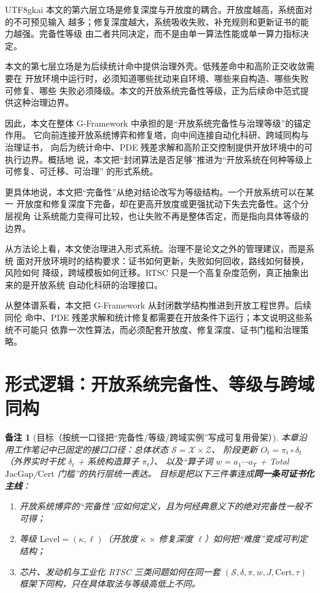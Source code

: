 \documentclass[12pt]{article}
\newtheorem{remark}{备注}[section]
\newcommand{\JacGap}{\ensuremath{\mathrm{JacGap}}}
\newcommand{\Cert}{\ensuremath{\mathrm{Cert}}}
\begin{document}
\begin{CJK*}{UTF8}{gkai}
本文的第六层立场是修复深度与开放度的耦合。开放度越高，系统面对的不可预见输入
越多；修复深度越大，系统吸收失败、补充规则和更新证书的能力越强。完备性等级
由二者共同决定，而不是由单一算法性能或单一算力指标决定。

本文的第七层立场是为后续统计命中提供治理外壳。低残差命中和高阶正交收敛需要在
开放环境中运行时，必须知道哪些扰动来自环境、哪些来自构造、哪些失败可修复、哪些
失败必须降级。本文的开放系统完备性等级，正为后续命中范式提供这种治理边界。

因此，本文在整体 G-Framework 中承担的是“开放系统完备性与治理等级”的锚定作用。
它向前连接开放系统博弈和修复塔，向中间连接自动化科研、跨域同构与治理证书，
向后为统计命中、PDE 残差求解和高阶正交控制提供开放环境中的可执行边界。概括地
说，本文把“封闭算法是否足够”推进为“开放系统在何种等级上可修复、可迁移、可治理”
的形式系统。

更具体地说，本文把“完备性”从绝对结论改写为等级结构。一个开放系统可以在某一
开放度和修复深度下完备，却在更高开放度或更强扰动下失去完备性。这个分层视角
让系统能力变得可比较，也让失败不再是整体否定，而是指向具体等级的边界。

从方法论上看，本文使治理进入形式系统。治理不是论文之外的管理建议，而是系统
面对开放环境时的结构要求：证书如何更新，失败如何回收，路线如何替换，风险如何
降级，跨域模板如何迁移。RTSC 只是一个高复杂度范例，真正抽象出来的是开放系统
自动化科研的治理接口。

从整体谱系看，本文把 G-Framework 从封闭数学结构推进到开放工程世界。后续同伦
命中、PDE 残差求解和统计修复都需要在开放条件下运行；本文说明这些系统不可能只
依靠一次性算法，而必须配套开放度、修复深度、证书门槛和治理策略。

\setcounter{tocdepth}{3}
\setcounter{secnumdepth}{3}
\tableofcontents
\clearpage

\section{形式逻辑：开放系统完备性、等级与跨域同构}
\label{sec:tex25-formal-logic}

\begin{remark}[目标（按统一口径把“完备性/等级/跨域实例”写成可复用骨架）]
本章沿用工作笔记中已固定的接口口径：总体状态 $\mathcal{S}=\mathcal{X}\times\mathcal{Z}$、
阶段更新 $O_t=\pi_t\circ\delta_t$（外界实时干扰 $\delta_t$ + 系统构造算子 $\pi_t$）、
以及“算子词 $w=a_1\cdots a_T$ + Total \JacGap/\Cert{} 门槛”的执行层统一表达。
目标是把以下三件事连成\textbf{同一条可证书化主线}：
\begin{enumerate}
  \item 开放系统博弈的“完备性”应如何定义，且为何经典意义下的绝对完备性一般不可得；
  \item 等级 $\mathrm{Level}=(\kappa,\ell)$（开放度 $\kappa$ $\times$ 修复深度 $\ell$）如何把“难度”变成可判定结构；
  \item 芯片、发动机与工业化 RTSC 三类问题如何在同一套 $(\mathcal{S},\delta,\pi,w,J,\Cert,\tau)$ 框架下同构，只在具体取法与等级高低上不同。
\end{enumerate}
\end{remark}


\end{CJK*}
\end{document}

